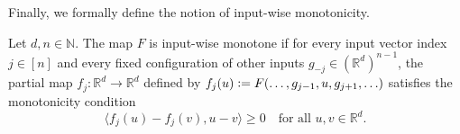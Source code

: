 \documentclass[twoside,11pt]{article}
\newcommand\mc{\mathcal}
\newcommand\mb{\mathbb}
\begin{document}
Finally, we formally define the notion of input-wise monotonicity.
\begin{definition}\label{def:workerwisemonotone}
    Let $d, n \in \mathbb{N}$.
    The map $F$ is input-wise monotone if for every input vector index $j \in [n]$ and every fixed configuration of other inputs $g_{-j} \in (\mathbb{R}^d)^{n-1}$, the partial map $f_j: \mathbb{R}^d \to \mathbb{R}^d$ defined by $f_j(u) \vcentcolon= F(\ldots, g_{j-1}, u, g_{j+1}, \ldots)$ satisfies the monotonicity condition
    \[ \langle f_j(u) - f_j(v), u - v \rangle \ge 0 \quad \text{for all } u, v \in \mathbb{R}^d. \]
\end{definition}

\end{document}
